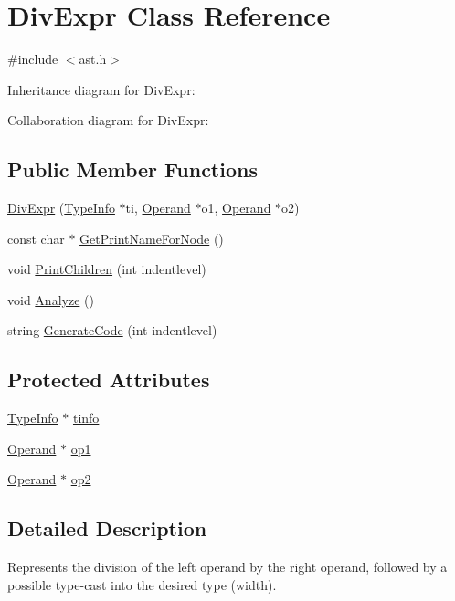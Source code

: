 \hypertarget{class_div_expr}{}\section{Div\+Expr Class Reference}
\label{class_div_expr}


{\ttfamily \#include $<$ast.\+h$>$}



Inheritance diagram for Div\+Expr\+:


Collaboration diagram for Div\+Expr\+:
\subsection*{Public Member Functions}
\begin{DoxyCompactItemize}
\item 
\hyperlink{class_div_expr_ae59054587548da05968fb80f2c25e07e}{Div\+Expr} (\hyperlink{class_type_info}{Type\+Info} $\ast$ti, \hyperlink{class_operand}{Operand} $\ast$o1, \hyperlink{class_operand}{Operand} $\ast$o2)
\item 
const char $\ast$ \hyperlink{class_div_expr_a1d35e7146d95f16a05fd37e3ed2184e8}{Get\+Print\+Name\+For\+Node} ()
\item 
void \hyperlink{class_div_expr_aa1cdd3697a8229c022827a041e4ac1be}{Print\+Children} (int indentlevel)
\item 
void \hyperlink{class_div_expr_ac2e3fa38bfbe56b3f832266e1679200f}{Analyze} ()
\item 
string \hyperlink{class_div_expr_a52d45f24aee4c323d57a133f4ee93b2d}{Generate\+Code} (int indentlevel)
\end{DoxyCompactItemize}
\subsection*{Protected Attributes}
\begin{DoxyCompactItemize}
\item 
\hyperlink{class_type_info}{Type\+Info} $\ast$ \hyperlink{class_div_expr_a38c94a688e9ea6e9c7359d6f2df24de6}{tinfo}
\item 
\hyperlink{class_operand}{Operand} $\ast$ \hyperlink{class_div_expr_a2d2f63a712f0f049ab9c9317c70c7488}{op1}
\item 
\hyperlink{class_operand}{Operand} $\ast$ \hyperlink{class_div_expr_a06cd348b836216c118b2a769be1d6bb8}{op2}
\end{DoxyCompactItemize}


\subsection{Detailed Description}
Represents the division of the left operand by the right operand, followed by a possible type-\/cast into the desired type (width). 

